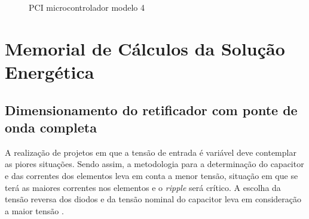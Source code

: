 \begin{apendicesenv}
\begin{figure}[H]
    \centering
    \caption{PCI microcontrolador modelo 4}\label{fig:PCB_micro4}
\end{figure}



\chapter{Memorial de Cálculos da Solução Energética}
\label{Energia_memorial}

\section{Dimensionamento do retificador com ponte de onda completa}

A realização de projetos em que a tensão de entrada é variável deve contemplar as piores situações. Sendo assim, a metodologia para a determinação do capacitor e das correntes dos elementos leva em conta a menor tensão, situação em que se terá as maiores correntes nos elementos e o \textit{ripple} será crítico. A escolha da tensão reversa dos diodos e da tensão nominal do capacitor leva em consideração a maior tensão \cite{retificador}.


\end{apendicesenv}
